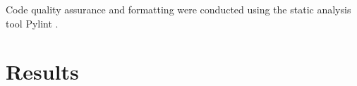 \documentclass{article}
\begin{document}
Code quality assurance and formatting were conducted using the static analysis tool Pylint \cite{pylint}.

\newpage

\section{Results}


\end{document}
